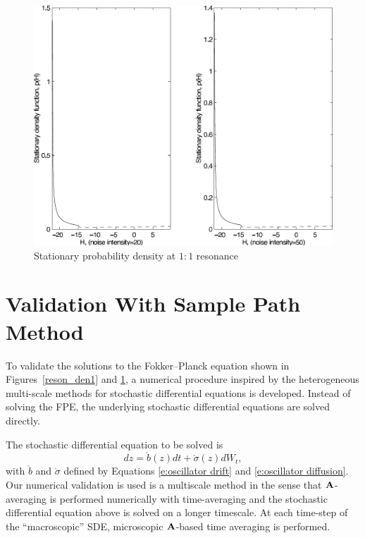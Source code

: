 \begin{figure}[htbp]
\begin{center}
\includegraphics[width=\textwidth]{figures/res_den2}
\caption{Stationary probability density at $1:1$ resonance}
\label{reson_den2}
\end{center}
\end{figure}

\section{Validation With Sample Path Method}

To validate the solutions to the Fokker--Planck equation shown in Figures~\ref{reson_den1} and \ref{reson_den2}, a numerical procedure inspired by the heterogeneous multi-scale methods for stochastic differential equations \citep{e05:_analy} is developed. Instead of solving the FPE, the underlying stochastic differential equations are solved directly.

The stochastic differential equation to be solved is
\begin{equation}
dz = \mathring b(z) dt + \mathring \sigma(z) dW_t,\label{e:hmm sde}
\end{equation}
with $\mathring b$ and $\mathring \sigma$ defined by Equations \eqref{e:oscillator drift} and \eqref{e:oscillator diffusion}. Our numerical validation is used is a multiscale method in the sense that $\operatorname{\mathbf A}$-averaging is performed numerically with time-averaging and the stochastic differential equation above is solved on a longer timescale. At each time-step of the ``macroscopic'' SDE, microscopic $\operatorname{\mathbf A}$-based time averaging is performed.

